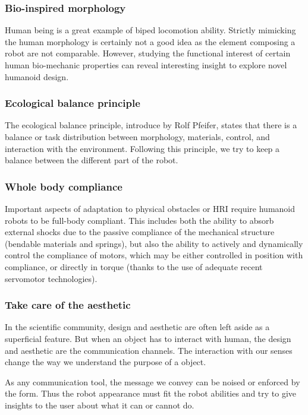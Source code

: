 \subsubsection{Bio-inspired morphology} %
Human being is a great example of biped locomotion ability.
Strictly mimicking the human morphology is certainly not a good idea as the element composing a robot are not comparable.
However, studying the functional interest of certain human bio-mechanic properties can reveal interesting insight to explore novel humanoid design.

\subsubsection{Ecological balance principle} %
The ecological balance principle, introduce by Rolf Pfeifer, states that there is a balance or task distribution between morphology, materials, control, and interaction with the environment.
Following this principle, we try to keep a balance between the different part of the robot.

\subsubsection{Whole body compliance} %
Important aspects of adaptation to physical obstacles or HRI require humanoid robots to be full-body compliant.
This includes both the ability to absorb external shocks due to the passive compliance of the mechanical structure (bendable materials and springs), but also the ability to actively and dynamically control the compliance of motors, which may be either controlled in position with compliance, or directly in torque (thanks to the use of adequate recent servomotor technologies).

\subsubsection{Take care of the aesthetic} %
In the scientific community, design and aesthetic are often left aside as a superficial feature.
But when an object has to interact with human, the design and aesthetic are the communication channels.
The interaction with our senses change the way we understand the purpose of a object.

As any communication tool, the message we convey can be noised or enforced by the form.
Thus the robot appearance must fit the robot abilities and try to give insights to the user about what it can or cannot do.

